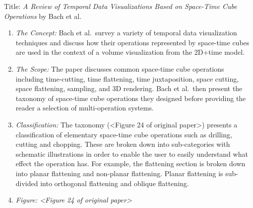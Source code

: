 \begin{footnotesize}
Title: \textit{A Review of Temporal Data Visualizations Based on Space-Time Cube Operations} by Bach et al. \cite{bach2014review}
\begin{enumerate}
\item \textit{The Concept:}
Bach et al.\ survey a variety of temporal data visualization techniques and discuss how their operations represented by space-time cubes are used in the context of a volume visualization from the 2D+time model. \cite{bach2014review}
\item \textit{The Scope:}
The paper discusses common space-time cube operations including time-cutting, time flattening, time juxtaposition, space cutting, space flattening, sampling, and 3D rendering. Bach et al.\ then present the taxonomy of space-time cube operations they designed before providing the reader a selection of multi-operation systems.

\item \textit{Classification:}
The taxonomy (<Figure 24 of original paper>) presents a classification of elementary space-time cube operations such as drilling, cutting and chopping. These are broken down into sub-categories with schematic illustrations in order to enable the user to easily understand what effect the operation has. For example, the flattening section is broken down into planar flattening and non-planar flattening. Planar flattening is sub-divided into orthogonal flattening and oblique flattening.

\item \textit{Figure: <Figure 24 of original paper> }


\end{enumerate}
\end{footnotesize}

